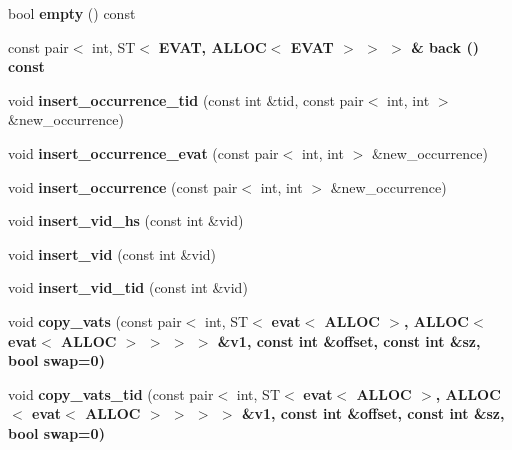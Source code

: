\begin{CompactItemize}
\item 
bool \textbf{empty} () const \label{classvat_3_01GRAPH__PROP_00_01V__Fk1__MINE__PROP_00_01ALLOC_00_01ST_01_4_12cb106bc01f77106e35965ef99c05ca}

\item 
const pair$<$ int, ST$<$ \bf{EVAT}, ALLOC$<$ \bf{EVAT} $>$ $>$ $>$ \& \textbf{back} () const \label{classvat_3_01GRAPH__PROP_00_01V__Fk1__MINE__PROP_00_01ALLOC_00_01ST_01_4_bef632223fa55801b1313877a3897150}

\item 
void \textbf{insert\_\-occurrence\_\-tid} (const int \&tid, const pair$<$ int, int $>$ \&new\_\-occurrence)\label{classvat_3_01GRAPH__PROP_00_01V__Fk1__MINE__PROP_00_01ALLOC_00_01ST_01_4_81c607c51d95a30b2ad336c05f4530dc}

\item 
void \textbf{insert\_\-occurrence\_\-evat} (const pair$<$ int, int $>$ \&new\_\-occurrence)\label{classvat_3_01GRAPH__PROP_00_01V__Fk1__MINE__PROP_00_01ALLOC_00_01ST_01_4_149d11785a8125938b239b0bbacedecd}

\item 
void \textbf{insert\_\-occurrence} (const pair$<$ int, int $>$ \&new\_\-occurrence)\label{classvat_3_01GRAPH__PROP_00_01V__Fk1__MINE__PROP_00_01ALLOC_00_01ST_01_4_a788a4acfbeef2675a0e2555ba4ee2c4}

\item 
void \textbf{insert\_\-vid\_\-hs} (const int \&vid)\label{classvat_3_01GRAPH__PROP_00_01V__Fk1__MINE__PROP_00_01ALLOC_00_01ST_01_4_4d6f57b35377ed73b20ec9a36dfe20d8}

\item 
void \textbf{insert\_\-vid} (const int \&vid)\label{classvat_3_01GRAPH__PROP_00_01V__Fk1__MINE__PROP_00_01ALLOC_00_01ST_01_4_e95e65b8a54f6b869259cdb22f455eab}

\item 
void \textbf{insert\_\-vid\_\-tid} (const int \&vid)\label{classvat_3_01GRAPH__PROP_00_01V__Fk1__MINE__PROP_00_01ALLOC_00_01ST_01_4_7a4765b8833d1a7ecdca57b1aa29d4ac}

\item 
void \textbf{copy\_\-vats} (const pair$<$ int, ST$<$ \bf{evat}$<$ ALLOC $>$, ALLOC$<$ \bf{evat}$<$ ALLOC $>$ $>$ $>$ $>$ \&v1, const int \&offset, const int \&sz, bool swap=0)\label{classvat_3_01GRAPH__PROP_00_01V__Fk1__MINE__PROP_00_01ALLOC_00_01ST_01_4_c38563a0df7af5bd5bb617bf16d0014f}

\item 
void \textbf{copy\_\-vats\_\-tid} (const pair$<$ int, ST$<$ \bf{evat}$<$ ALLOC $>$, ALLOC$<$ \bf{evat}$<$ ALLOC $>$ $>$ $>$ $>$ \&v1, const int \&offset, const int \&sz, bool swap=0)\label{classvat_3_01GRAPH__PROP_00_01V__Fk1__MINE__PROP_00_01ALLOC_00_01ST_01_4_eed616e0e7f53bfcff9b0246946ff44e}


\end{CompactItemize}
